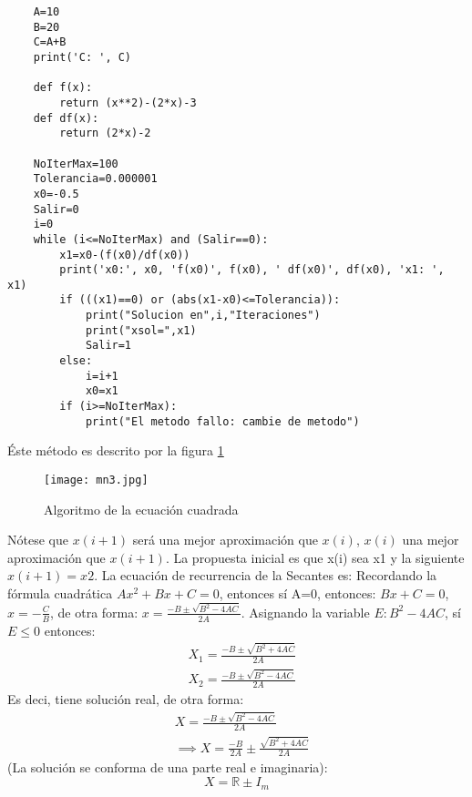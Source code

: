 \begin{lstlisting}
    A=10
    B=20
    C=A+B
    print('C: ', C)
    
    def f(x):
        return (x**2)-(2*x)-3
    def df(x):
        return (2*x)-2
    
    NoIterMax=100
    Tolerancia=0.000001
    x0=-0.5
    Salir=0
    i=0
    while (i<=NoIterMax) and (Salir==0):
        x1=x0-(f(x0)/df(x0))
        print('x0:', x0, 'f(x0)', f(x0), ' df(x0)', df(x0), 'x1: ', x1)
        if (((x1)==0) or (abs(x1-x0)<=Tolerancia)):
            print("Solucion en",i,"Iteraciones")
            print("xsol=",x1)
            Salir=1
        else:
            i=i+1
            x0=x1
        if (i>=NoIterMax):
            print("El metodo fallo: cambie de metodo")
    \end{lstlisting}
    Éste método es descrito por la figura \ref{mn3}
\begin{figure}[h!]
\centering
  \texttt{[image: mn3.jpg]}
  \caption{Algoritmo de la ecuación cuadrada}
  \label{mn3}
\end{figure}
    Nótese que $x(i+1)$ será una mejor aproximación que $x(i)$, $x(i)$ una mejor aproximación que $x(i+1)$. La propuesta inicial es que x(i) sea x1 y la siguiente $x(i+1)=x2$.
    La ecuación de recurrencia de la Secantes es:
    Recordando la fórmula cuadrática $Ax^2+Bx+C=0$, entonces sí A=0, entonces: $Bx+C=0$, 
    $x=-\frac{C}{B}$, de otra forma: $x=\frac{-B\pm\sqrt{B^2-4AC}}{2A}$.
    Asignando la variable $E: B^2-4AC$, sí $E\leq 0$ entonces:
    \begin{align*}
        &X_1 = \frac{-B\pm\sqrt{B^2 +4AC}}{2A}\\
        &X_2 = \frac{-B\pm\sqrt{B^2-4AC}}{2A}
    \end{align*}
    Es deci, tiene solución real, de otra forma:
    \begin{align*}
        &X = \frac{-B\pm\sqrt{B^2-4AC}}{2A}\\
        &\implies X = \frac{- B}{2A}\pm\frac{\sqrt{B^2+4AC}}{2A}
    \end{align*}
    (La solución se conforma de una parte real e imaginaria):
    \begin{equation*}
        X = \mathbb{R} \pm I_m
    \end{equation*}
